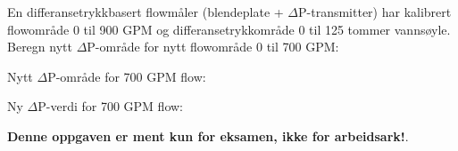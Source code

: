

En differansetrykkbasert flowmåler (blendeplate + $\Delta$P-transmitter) har kalibrert flowområde 0 til 900 GPM og differansetrykkområde 0 til 125 tommer vannsøyle. Beregn nytt $\Delta$P-område for nytt flowområde 0 til 700 GPM:

\vskip 10pt

Nytt $\Delta$P-område for 700 GPM flow: \underbar{\hskip 50pt}







Ny $\Delta$P-verdi for 700 GPM flow: 







{\bf Denne oppgaven er ment kun for eksamen, ikke for arbeidsark!}.



